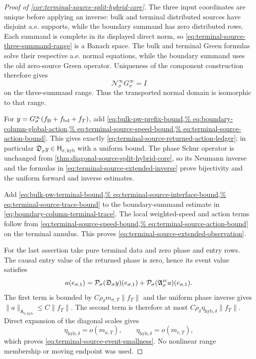 \begin{proof}[Proof of
\cref{cor:terminal-source-split-hybrid-core}]
The three input coordinates are unique before applying an inverse: bulk and
terminal distributed sources have disjoint a.e. supports, while the
boundary summand has zero distributed rows.  Each summand is complete in
its displayed direct norm, so
\cref{eq:terminal-source-three-summand-range} is a Banach space.  The bulk
and terminal Green formulas solve their respective a.e. normal equations,
while the boundary summand uses the old zero-source Green operator.
Uniqueness of the component construction therefore gives
\begin{equation*}
 \mathscr N_\sigma^\infty G_\sigma^\infty=I
\end{equation*}
on the three-summand range.  Thus the transported normal domain is
isomorphic to that range.

For
\(
y=G_\sigma^\infty(f_{\rm B}+f_{\rm bd}+f_T)
\), add
\cref{eq:bulk-pw-prefix-bound,%
eq:boundary-column-global-action,%
eq:terminal-source-speed-bound,%
eq:terminal-source-action-bound}.
This gives exactly
\cref{eq:terminal-source-returned-action-ledger}; in particular
\(
\mathfrak D_\sigma y\in\mathsf H_{\sigma,\mathrm{hyb}}
\)
with a uniform bound.  The phase Schur operator is unchanged from
\cref{thm:diagonal-source-split-hybrid-core}, so its Neumann inverse and
the formulas in \cref{eq:terminal-source-extended-inverse} prove
bijectivity and the uniform forward and inverse estimates.

Add
\cref{eq:bulk-pw-terminal-bound,%
eq:terminal-source-interface-bound,%
eq:terminal-source-trace-bound}
to the boundary-summand estimate in
\cref{eq:boundary-column-terminal-trace}.  The local weighted-speed and
action terms follow from
\cref{eq:terminal-source-speed-bound,%
eq:terminal-source-action-bound}
on the terminal annulus.  This proves
\cref{eq:terminal-source-extended-observation}.

For the last assertion take pure terminal data and zero phase and entry
rows.  The causal entry value of the returned phase is zero, hence its
event value satisfies
\begin{equation}
 a(e_{\sigma,1})
 =\mathcal P_\sigma(\mathfrak D_\sigma y)(e_{\sigma,1})
  +\mathcal P_\sigma(\mathfrak A_\sigma^{\rm rc}a)
       (e_{\sigma,1}).                            \label{eq:proof-terminal-source-event-prefix}
\end{equation}
The first term is bounded by
\(
C\rho_\delta m_{\sigma,T}\|f_T\|
\)
and the uniform phase inverse gives
\(
\|a\|_{\mathsf A_{\sigma,\mathrm{hyb}}}\le C\|f_T\|
\).
The second term is therefore at most
\(
C\rho_\delta\eta_{\mathrm{hyb},\delta}\|f_T\|
\).
Direct expansion of the diagonal scales gives
\begin{equation*}
 \eta_{\mathrm{hyb},\delta}=o(m_{a,T}),\qquad
 \eta_{\mathrm{hyb},\delta}=o(m_{r,T}),
\end{equation*}
which proves \cref{eq:terminal-source-event-smallness}.  No nonlinear
range membership or moving endpoint was used.
\end{proof}

